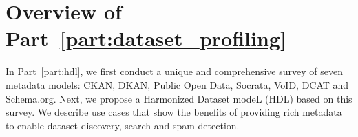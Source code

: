 \chapter*{Overview of Part~\ref{part:dataset_profiling}}

In Part~\ref{part:hdl}, we first conduct a unique and comprehensive survey of seven metadata models: CKAN, DKAN, Public Open Data, Socrata, VoID, DCAT and Schema.org. Next, we propose a Harmonized Dataset modeL (HDL) based on this survey. We describe use cases that show the benefits of providing rich metadata to enable dataset discovery, search and spam detection.
